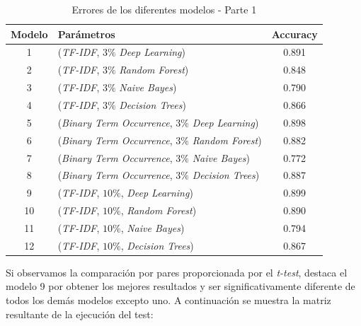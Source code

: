 \documentclass[12pt]{report} %
\begin{document}
    \begin{table}[H]
        \begin{center}
            \begin{tabular}{ @{}clc@{} }
                \toprule
                Modelo & Parámetros\footnotemark[1] & Accuracy\\
                \midrule
                1  & (\textit{TF-IDF}, $3\%$                 \textit{Deep Learning})  & 0.891\\
                2  & (\textit{TF-IDF}, $3\%$                 \textit{Random Forest})  & 0.848\\
                3  & (\textit{TF-IDF}, $3\%$                 \textit{Naive Bayes})    & 0.790\\
                4  & (\textit{TF-IDF}, $3\%$                 \textit{Decision Trees}) & 0.866\\
                5  & (\textit{Binary Term Occurrence}, $3\%$ \textit{Deep Learning})  & 0.898\\
                6  & (\textit{Binary Term Occurrence}, $3\%$ \textit{Random Forest})  & 0.882\\
                7  & (\textit{Binary Term Occurrence}, $3\%$ \textit{Naive Bayes})    & 0.772\\
                8  & (\textit{Binary Term Occurrence}, $3\%$ \textit{Decision Trees}) & 0.887\\
                9  & (\textit{TF-IDF}, $10\%$,               \textit{Deep Learning})  & 0.899\\
                10 & (\textit{TF-IDF}, $10\%$,               \textit{Random Forest})  & 0.890\\
                11 & (\textit{TF-IDF}, $10\%$,               \textit{Naive Bayes})    & 0.794\\
                12 & (\textit{TF-IDF}, $10\%$,               \textit{Decision Trees}) & 0.867\\
                \bottomrule
            \end{tabular}
            \caption{Errores de los diferentes modelos - Parte 1}
        \end{center}
    \end{table}

    Si observamos la comparación por pares proporcionada por el \textit{t-test},
    destaca el modelo 9 por obtener los mejores resultados y ser significativamente
    diferente de todos los demás modelos excepto uno. A continuación se muestra
    la matriz resultante de la ejecución del test:
\end{document}

